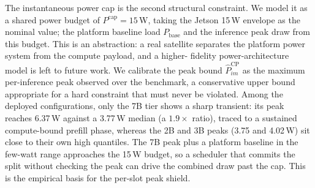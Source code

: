 The instantaneous power cap is the second structural constraint. We model it as a
shared power budget of $P^{\text{cap}}{=}15$\,W, taking the Jetson 15\,W envelope
as the nominal value; the platform baseline load $P_{\text{base}}$ and the
inference peak draw from this budget. This is an abstraction: a real satellite
separates the platform power system from the compute payload, and a higher-
fidelity power-architecture model is left to future work. We calibrate the peak
bound $\hat{P}_{im}^{\text{CP}}$ as the maximum per-inference peak observed over
the benchmark, a conservative upper bound appropriate for a hard constraint that
must never be violated. Among the deployed configurations, only the 7B tier
shows a sharp transient: its peak reaches 6.37\,W against a 3.77\,W median (a
$1.9\times$ ratio), traced to a sustained compute-bound prefill phase, whereas
the 2B and 3B peaks (3.75 and 4.02\,W) sit close to their own high quantiles. The
7B peak plus a platform baseline in the few-watt range approaches the 15\,W
budget, so a scheduler that commits the split without checking the peak can drive
the combined draw past the cap. This is the empirical basis for the per-slot peak
shield.

